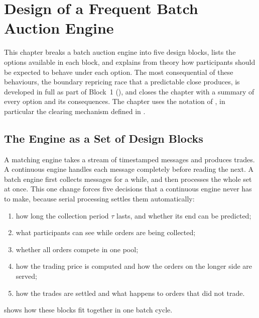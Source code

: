\chapter{Design of a Frequent Batch Auction Engine}
\label{ch:design}

This chapter breaks a batch auction engine into five design blocks, lists the
options available in each block, and explains from theory how participants
should be expected to behave under each option. The most consequential of
these behaviours, the boundary repricing race that a predictable close
produces, is developed in full as part of Block~1
(), and  closes the
chapter with a summary of every option and its consequences. The chapter
uses the notation of , in particular the clearing
mechanism defined in .

\section{The Engine as a Set of Design Blocks}
\label{sec:blocks}

A matching engine takes a stream of timestamped messages and produces trades.
A continuous engine handles each message completely before reading the next.
A batch engine first collects messages for a while, and then processes the whole
set at once. This one change forces five decisions that a continuous engine
never has to make, because serial processing settles them automatically:

\begin{enumerate}
  \item how long the collection period $\tau$ lasts, and whether its end can be
  predicted;
  \item what participants can see while orders are being collected;
  \item whether all orders compete in one pool;
  \item how the trading price is computed and how the orders on the longer
  side are served;
  \item how the trades are settled and what happens to orders that did not
  trade.
\end{enumerate}

 shows how these blocks fit together in one batch cycle.

